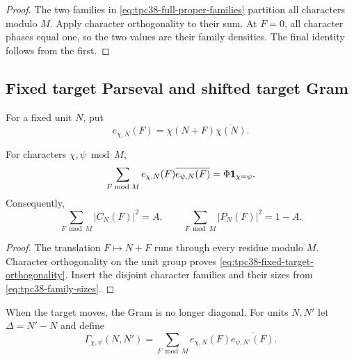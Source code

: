 \begin{proof}
The two families in \eqref{eq:tpc38-full-proper-families} partition all
characters modulo \(M\).  Apply character orthogonality to their sum.  At
\(F=0\), all character phases equal one, so the two values are their
family densities.  The final identity follows from the first.
\end{proof}

\subsection{Fixed target Parseval and shifted target Gram}

For a fixed unit \(N\), put
\begin{equation}
 e_{\chi,N}(F)
 =\chi(N+F)\overline{\chi(N)}.
 \label{eq:tpc38-echiN}
\end{equation}

\begin{proposition}
\label{prop:tpc38-fixed-target-Parseval}
For characters \(\chi,\psi\bmod M\),
\begin{equation}
 \sum_{F\bmod M}e_{\chi,N}(F)
 \overline{e_{\psi,N}(F)}
 =\Phi\mathbf 1_{\chi=\psi}.
 \label{eq:tpc38-fixed-target-orthogonality}
\end{equation}
Consequently,
\begin{equation}
 \boxed{
 \sum_{F\bmod M}|C_N(F)|^2=A,\qquad
 \sum_{F\bmod M}|P_N(F)|^2=1-A.}
 \label{eq:tpc38-fixed-target-face-norms}
\end{equation}
\end{proposition}

\begin{proof}
The translation \(F\mapsto N+F\) runs through every residue modulo \(M\).
Character orthogonality on the unit group proves
\eqref{eq:tpc38-fixed-target-orthogonality}.  Insert the disjoint character
families and their sizes from \eqref{eq:tpc38-family-sizes}.
\end{proof}

When the target moves, the Gram is no longer diagonal.  For units \(N,N'\)
let \(\Delta=N'-N\) and define
\begin{equation}
 \Gamma_{\chi,\psi}(N,N')
 =\sum_{F\bmod M}e_{\chi,N}(F)
 \overline{e_{\psi,N'}(F)}.
 \label{eq:tpc38-shifted-Gram-definition}
\end{equation}

